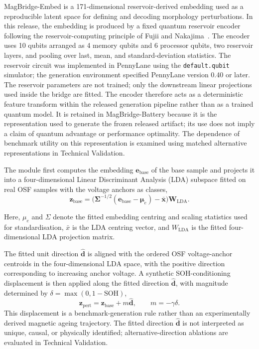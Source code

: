 \documentclass[11pt]{article}
\begin{document}
MagBridge-Embed is a 171-dimensional reservoir-derived embedding used as a reproducible latent space for defining and decoding morphology perturbations. In this release, the embedding is produced by a fixed quantum reservoir encoder following the reservoir-computing principle of Fujii and Nakajima~\cite{fujii2017qrc}. The encoder uses 10 qubits arranged as 4 memory qubits and 6 processor qubits, two reservoir layers, and pooling over last, mean, and standard-deviation statistics. The reservoir circuit was implemented in PennyLane using the \texttt{default.qubit} simulator; the generation environment specified PennyLane version 0.40 or later. The reservoir parameters are not trained; only the downstream linear projections used inside the bridge are fitted. The encoder therefore acts as a deterministic feature transform within the
released generation pipeline rather than as a trained quantum model. It is retained in MagBridge-Battery because it is the representation used to generate the frozen released artifact; its use does not imply a claim of quantum advantage or performance optimality. The dependence of benchmark utility on this representation is examined using matched alternative representations in Technical Validation.

The module first computes the embedding $\mathbf{e}_{\mathrm{base}}$
of the base sample and projects it into a four-dimensional Linear
Discriminant Analysis (LDA) subspace fitted on real OSF samples with the
voltage anchors as classes,
\begin{equation}
\mathbf{z}_{\mathrm{base}} =
\big(\boldsymbol{\Sigma}^{-1/2}
(\mathbf{e}_{\mathrm{base}}-\boldsymbol{\mu}_e)
-\bar{\mathbf{x}}\big)\mathbf{W}_{\mathrm{LDA}}.
\end{equation}

Here, $\mu_e$ and $\Sigma$ denote the fitted embedding centring and scaling
statistics used for standardisation, $\bar{x}$ is the LDA centring vector,
and $W_{\mathrm{LDA}}$ is the fitted four-dimensional LDA projection matrix.

The fitted unit direction $\hat{\mathbf{d}}$ is aligned with the ordered OSF voltage-anchor centroids in the four-dimensional LDA space, with the positive direction corresponding to increasing anchor voltage. A synthetic SOH-conditioning displacement is then applied along the fitted
direction $\hat{\mathbf{d}}$, with magnitude determined by
$\delta=\max(0,1-\mathrm{SOH})$,
\begin{equation}
\mathbf{z}_{\mathrm{pert}} =
\mathbf{z}_{\mathrm{base}} + m\hat{\mathbf{d}},
\qquad
m=-\gamma\delta.
\end{equation}
This displacement is a benchmark-generation rule rather than an
experimentally derived magnetic ageing trajectory. The fitted direction
$\hat{\mathbf{d}}$ is not interpreted as unique, causal, or physically
identified; alternative-direction ablations are evaluated in Technical
Validation.
\end{document}
